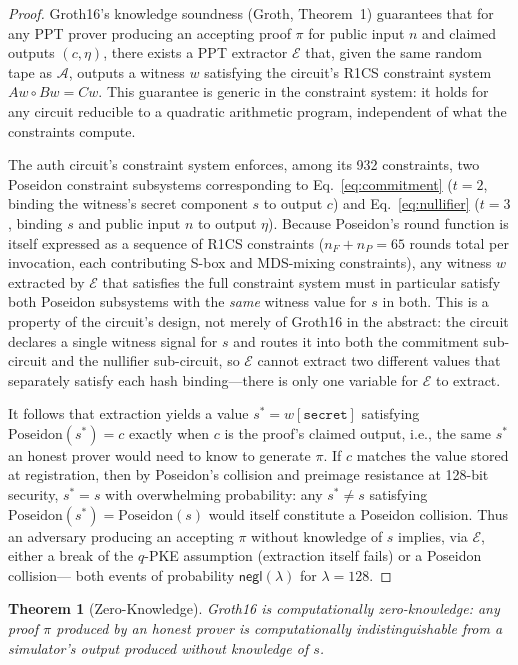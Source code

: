 \documentclass[12pt,a4paper,oneside]{report}
\newtheorem{theorem}{Theorem}[chapter]
\begin{document}
\begin{proof}
Groth16's knowledge soundness (Groth, Theorem~1) guarantees that for any
PPT prover producing an accepting proof $\pi$ for public input $n$ and
claimed outputs $(c, \eta)$, there exists a PPT extractor $\mathcal{E}$
that, given the same random tape as $\mathcal{A}$, outputs a witness $w$
satisfying the circuit's R1CS constraint system $Aw \circ Bw = Cw$. This
guarantee is generic in the constraint system: it holds for any circuit
reducible to a quadratic arithmetic program, independent of what the
constraints compute.

The auth circuit's constraint system enforces, among its 932 constraints,
two Poseidon constraint subsystems corresponding to
Eq.~\ref{eq:commitment} ($t{=}2$, binding the witness's secret component
$s$ to output $c$) and Eq.~\ref{eq:nullifier} ($t{=}3$, binding $s$ and
public input $n$ to output $\eta$). Because Poseidon's round function is
itself expressed as a sequence of R1CS constraints ($n_F{+}n_P{=}65$
rounds total per invocation, each contributing S-box and MDS-mixing
constraints), any witness $w$ extracted by $\mathcal{E}$ that satisfies
the full constraint system must in particular satisfy both Poseidon
subsystems with the \emph{same} witness value for $s$ in both. This is a
property of the circuit's design, not merely of Groth16 in the abstract:
the circuit declares a single witness signal for $s$ and routes it into
both the commitment sub-circuit and the nullifier sub-circuit, so
$\mathcal{E}$ cannot extract two different values that separately satisfy
each hash binding---there is only one variable for $\mathcal{E}$ to
extract.

It follows that extraction yields a value $s^* = w[\mathtt{secret}]$
satisfying $\mathrm{Poseidon}(s^*) = c$ exactly when $c$ is the proof's
claimed output, i.e., the same $s^*$ an honest prover would need to know
to generate $\pi$. If $c$ matches the value stored at registration, then
by Poseidon's collision and preimage resistance at 128-bit security, $s^*
= s$ with overwhelming probability: any $s^* \neq s$ satisfying
$\mathrm{Poseidon}(s^*) = \mathrm{Poseidon}(s)$ would itself constitute a
Poseidon collision. Thus an adversary producing an accepting $\pi$ without
knowledge of $s$ implies, via $\mathcal{E}$, either a break of the
$q$-PKE assumption (extraction itself fails) or a Poseidon collision---
both events of probability $\mathsf{negl}(\lambda)$ for $\lambda=128$.
\end{proof}

\begin{theorem}[Zero-Knowledge]
Groth16 is computationally zero-knowledge: any proof $\pi$ produced by an
honest prover is computationally indistinguishable from a simulator's
output produced without knowledge of $s$.
\end{theorem}
\end{document}
